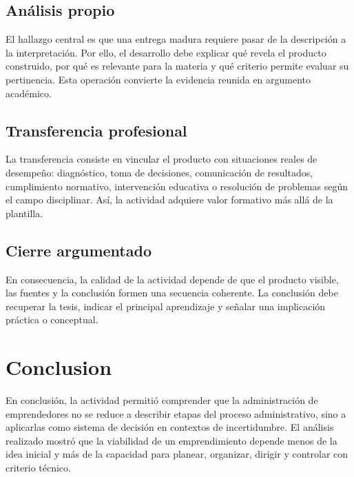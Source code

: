 \documentclass[
	spanish,
	letterpaper, oneside
]{article}
\begin{document}
\subsection*{Análisis propio}
El hallazgo central es que una entrega madura requiere pasar de la descripción a la interpretación. Por ello, el desarrollo debe explicar qué revela el producto construido, por qué es relevante para la materia y qué criterio permite evaluar su pertinencia. Esta operación convierte la evidencia reunida en argumento académico.

\subsection*{Transferencia profesional}
La transferencia consiste en vincular el producto con situaciones reales de desempeño: diagnóstico, toma de decisiones, comunicación de resultados, cumplimiento normativo, intervención educativa o resolución de problemas según el campo disciplinar. Así, la actividad adquiere valor formativo más allá de la plantilla.

\subsection*{Cierre argumentado}
En consecuencia, la calidad de la actividad depende de que el producto visible, las fuentes y la conclusión formen una secuencia coherente. La conclusión debe recuperar la tesis, indicar el principal aprendizaje y señalar una implicación práctica o conceptual.


\section{Conclusion}

En conclusión, la actividad permitió comprender que la administración de emprendedores no se reduce a describir etapas del proceso administrativo, sino a aplicarlas como sistema de decisión en contextos de incertidumbre. El análisis realizado mostró que la viabilidad de un emprendimiento depende menos de la idea inicial y más de la capacidad para planear, organizar, dirigir y controlar con criterio técnico.
\end{document}
